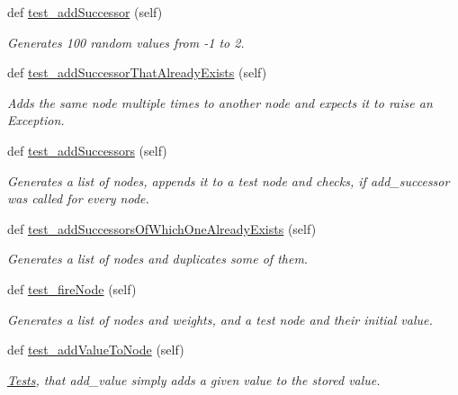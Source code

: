 \begin{DoxyCompactItemize}
def \hyperlink{classNEAT__PyGenetics_1_1NEAT_1_1Tests_1_1SimulationGenomeTests_1_1test__simulationNodes_1_1TestSimulationNode_ae62c393e1902601513fc583afc76cc26}{test\+\_\+add\+Successor} (self)
\begin{DoxyCompactList}\small\item\em Generates 100 random values from -\/1 to 2. \end{DoxyCompactList}\item 
def \hyperlink{classNEAT__PyGenetics_1_1NEAT_1_1Tests_1_1SimulationGenomeTests_1_1test__simulationNodes_1_1TestSimulationNode_aab4bc7e936bf62a62a3103528f3dc4ef}{test\+\_\+add\+Successor\+That\+Already\+Exists} (self)
\begin{DoxyCompactList}\small\item\em Adds the same node multiple times to another node and expects it to raise an Exception. \end{DoxyCompactList}\item 
def \hyperlink{classNEAT__PyGenetics_1_1NEAT_1_1Tests_1_1SimulationGenomeTests_1_1test__simulationNodes_1_1TestSimulationNode_a60e903a3c955ac9fe7245f8dc9df81f7}{test\+\_\+add\+Successors} (self)
\begin{DoxyCompactList}\small\item\em Generates a list of nodes, appends it to a test node and checks, if add\+\_\+successor was called for every node. \end{DoxyCompactList}\item 
def \hyperlink{classNEAT__PyGenetics_1_1NEAT_1_1Tests_1_1SimulationGenomeTests_1_1test__simulationNodes_1_1TestSimulationNode_a5db57231e1465f7659a5875e7ca4bf8e}{test\+\_\+add\+Successors\+Of\+Which\+One\+Already\+Exists} (self)
\begin{DoxyCompactList}\small\item\em Generates a list of nodes and duplicates some of them. \end{DoxyCompactList}\item 
def \hyperlink{classNEAT__PyGenetics_1_1NEAT_1_1Tests_1_1SimulationGenomeTests_1_1test__simulationNodes_1_1TestSimulationNode_aba98791f76639d8e17987dfbfd544ce2}{test\+\_\+fire\+Node} (self)
\begin{DoxyCompactList}\small\item\em Generates a list of nodes and weights, and a test node and their initial value. \end{DoxyCompactList}\item 
def \hyperlink{classNEAT__PyGenetics_1_1NEAT_1_1Tests_1_1SimulationGenomeTests_1_1test__simulationNodes_1_1TestSimulationNode_a9bd84563b74b73f13f5578c7373ec6a8}{test\+\_\+add\+Value\+To\+Node} (self)
\begin{DoxyCompactList}\small\item\em \hyperlink{namespaceNEAT__PyGenetics_1_1NEAT_1_1Tests}{Tests}, that add\+\_\+value simply adds a given value to the stored value. \end{DoxyCompactList}\end{DoxyCompactItemize}
